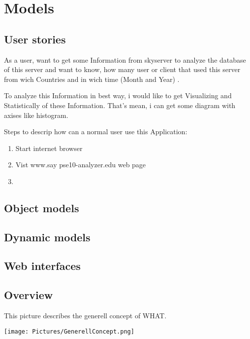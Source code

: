 \section{Models}

\subsection{User stories}

As a user, want to get some Information from skyserver to analyze the database of this server and want to know, how many 
user or client that used this server from wich Countries and in wich time (Month and Year) . 

To analyze this Information in best way, i would like to get Visualizing and Statistically of these Information.
That's mean, i can get some diagram with axises like histogram.

Steps to descrip how can a normal user use this Application:

\renewcommand{\theenumi}{\arabic{enumi}}
\renewcommand{\labelenumi}{\theenumi}

\begin{enumerate}

\item Start internet browser

\item Vist www.say pse10-analyzer.edu web page

\item 

\end{enumerate}

\subsection{Object models}

\subsection{Dynamic models}

\subsection{Web interfaces}

\newpage
\subsection{Overview}\label{overview}
This picture describes the generell concept of WHAT.
\begin{center}
\texttt{[image: Pictures/GenerellConcept.png]}
\end{center} 

